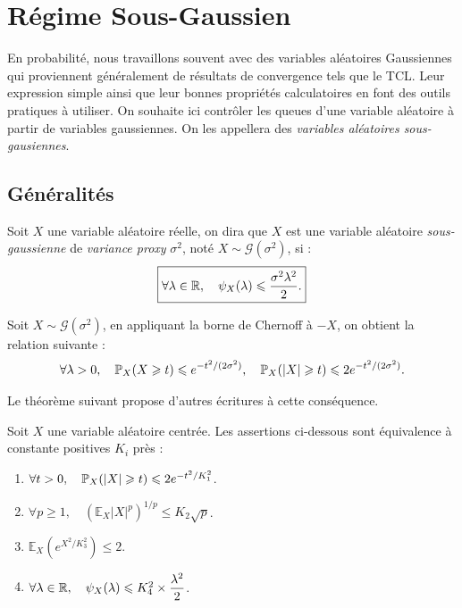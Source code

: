 
\section{Régime Sous-Gaussien}

En probabilité, nous travaillons souvent avec des variables aléatoires Gaussiennes qui proviennent généralement de résultats de convergence tels que le TCL. Leur expression simple ainsi que leur bonnes propriétés calculatoires en font des outils pratiques à utiliser. On souhaite ici contrôler les queues d'une variable aléatoire à partir de variables gaussiennes. On les appellera des \emph{variables aléatoires sous-gausiennes}. 

\subsection{Généralités}

\begin{definition}
    Soit $X$ une variable aléatoire réelle, on dira que $X$ est une variable aléatoire \emph{sous-gaussienne} de \emph{variance proxy} $ \sigma^2$, noté $ X \sim \mathcal{G}(\sigma^2)$, si : 
    \begin{equation}
        \boxed{\forall \lambda \in \mathbb{R}, \quad \psi_X( \lambda) \leqslant \frac{ \sigma^2 \lambda^2}{2}.} 
    \end{equation}
\end{definition}

\begin{proposition}
    Soit $ X \sim \mathcal{G}( \sigma^2)$, en appliquant la borne de Chernoff à $-X$, on obtient la relation suivante : 
    \begin{equation}
        \forall \lambda > 0, \quad \mathbb{P}_X(X \geqslant t) \leqslant e^{-t^2 / (2 \sigma^2)}, \quad \mathbb{P}_X(|X| \geqslant t) \leqslant 2 e^{-t^2/ (2 \sigma^2)}. 
    \end{equation}
\end{proposition}

Le théorème suivant propose d'autres écritures à cette conséquence. 

\begin{theorem}[Équivalences]
    Soit $X$ une variable aléatoire centrée. Les assertions ci-dessous sont équivalence à constante positives $K_i$ près :
    \begin{enumerate}
        \item $ \forall t > 0, \quad \mathbb{P}_X (|X| \geqslant t) \leqslant 2 e^{-t^2 / K_1^2}$. 
        \item $ \forall p \geqslant 1, \quad \left( \mathbb{E}_X |X|^p \right)^{1/p} \leqslant K_2 \sqrt{p}$. 
        \item $ \mathbb{E}_X \left( e^{X^2 / K_3^2}\right) \leqslant 2$. 
        \item $ \forall \lambda \in \mathbb{R}, \quad \psi_X( \lambda) \leqslant K_4^2 \times \displaystyle\frac{ \lambda^2}{2}$. 
    \end{enumerate}
\end{theorem}

